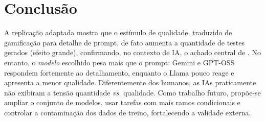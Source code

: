 \documentclass[12pt]{article}
\begin{document}
\section{Conclusão}

A replicação adaptada mostra que o estímulo de qualidade, traduzido de
gamificação para detalhe de prompt, de fato aumenta a quantidade de testes
gerados (efeito grande), confirmando, no contexto de IA, o achado central de
\cite{straubinger2025}. No entanto, o \emph{modelo} escolhido pesa mais que o
prompt: Gemini e GPT-OSS respondem fortemente ao detalhamento, enquanto o Llama
pouco reage e apresenta a menor qualidade. Diferentemente dos humanos, as IAs
praticamente não exibiram a tensão quantidade \emph{vs.} qualidade. Como trabalho
futuro, propõe-se ampliar o conjunto de modelos, usar tarefas com mais ramos
condicionais e controlar a contaminação dos dados de treino, fortalecendo a
validade externa.



\end{document}
